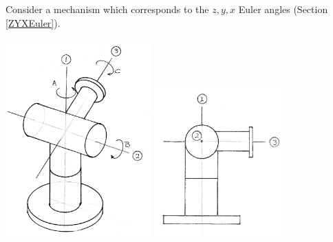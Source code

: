 \begin{Example}\label{ZYXWrist}
Consider a mechanism which corresponds to the $z,y,x$ Euler angles (Section \ref{ZYXEuler}).

\begin{center}
\includegraphics[width=2.2in]{figs04/00710.eps}
\includegraphics[width=1.943in]{figs04/00711.eps}
\end{center}


\end{Example}
